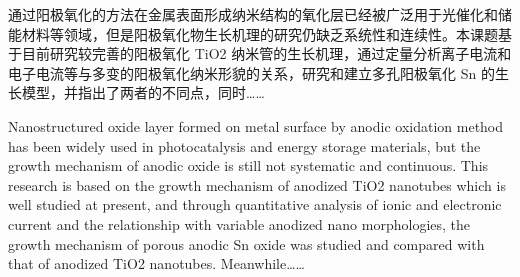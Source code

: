 \begin{njustcnabstract}
通过阳极氧化的方法在金属表面形成纳米结构的氧化层已经被广泛用于光催化和储能材料等领域，但是阳极氧化物生长机理的研究仍缺乏系统性和连续性。本课题基于目前研究较完善的阳极氧化 TiO2 纳米管的生长机理，通过定量分析离子电流和电子电流等与多变的阳极氧化纳米形貌的关系，研究和建立多孔阳极氧化 Sn 的生长模型，并指出了两者的不同点，同时……

\end{njustcnabstract}

\begin{njustenabstract}
Nanostructured oxide layer formed on metal surface by anodic oxidation method has been widely used in photocatalysis and energy storage materials, but the growth mechanism of anodic oxide is still not systematic and continuous. This research is based on the growth mechanism of anodized TiO2 nanotubes which is well studied at present, and through quantitative analysis of ionic and electronic current and the relationship with variable anodized nano morphologies, the growth mechanism of porous anodic Sn oxide was studied and compared with that of anodized TiO2 nanotubes. Meanwhile……

\end{njustenabstract}
